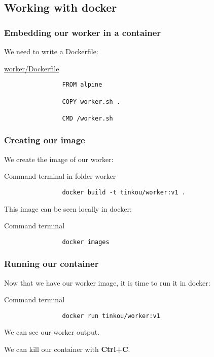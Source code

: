\subsection{Working with docker}

	\begin{frame}[fragile]
		\frametitle{Embedding our worker in a container}
		
		We need to write a Dockerfile:
		
		\begin{block}{\href{https://github.com/Tinkou/trainings/blob/master/trainings/sources/dev-onboarding/files/worker/Dockerfile}{worker/Dockerfile}}
			\begin{verbatim}
				FROM alpine

				COPY worker.sh .

				CMD /worker.sh
			\end{verbatim}
		\end{block}
	\end{frame}
	
	\begin{frame}[fragile]
		\frametitle{Creating our image}
		
		We create the image of our worker:
		
		\begin{block}{Command terminal in folder worker}
			\begin{verbatim}
				docker build -t tinkou/worker:v1 .
			\end{verbatim}
		\end{block}
		
		This image can be seen locally in docker:

		\begin{block}{Command terminal}
			\begin{verbatim}
				docker images
			\end{verbatim}
		\end{block}
		
	\end{frame}
	
	\begin{frame}[fragile]
		\frametitle{Running our container}
		
		Now that we have our worker image, it is time to run it in docker:
		
		\begin{block}{Command terminal}
			\begin{verbatim}
				docker run tinkou/worker:v1
			\end{verbatim}
		\end{block}
		We can see our worker output.
		
		We can kill our container with \textbf{Ctrl+C}.
		
	\end{frame}
	

